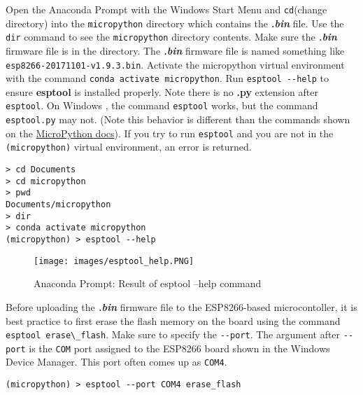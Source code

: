 \documentclass{book}
\makeatletter
\def\maxwidth{\ifdim\Gin@nat@width>\linewidth\linewidth
\else\Gin@nat@width\fi}
\let\Oldincludegraphics\includegraphics
\renewcommand{\includegraphics}[1]{\Oldincludegraphics[width=.8\maxwidth]{#1}}
\newcommand{\passthrough}[1]{#1}
\makeatother
\begin{document}
    
        Open the Anaconda Prompt with the Windows Start Menu and
\passthrough{\lstinline!cd!}(change directory) into the
\passthrough{\lstinline!micropython!} directory which contains the
\textbf{\emph{.bin}} file. Use the \passthrough{\lstinline!dir!} command
to see the \passthrough{\lstinline!micropython!} directory contents.
Make sure the \textbf{\emph{.bin}} firmware file is in the directory.
The \textbf{\emph{.bin}} firmware file is named something like
\passthrough{\lstinline!esp8266-20171101-v1.9.3.bin!}. Activate the
micropython virtual environment with the command
\passthrough{\lstinline!conda activate micropython!}. Run
\passthrough{\lstinline!esptool --help!} to ensure \textbf{esptool} is
installed properly. Note there is no \textbf{.py} extension after
\passthrough{\lstinline!esptool!}. On Windows , the command
\passthrough{\lstinline!esptool!} works, but the command
\passthrough{\lstinline!esptool.py!} may not. (Note this behavior is
different than the commands shown on the
\href{https://docs.micropython.org/en/latest/esp8266/esp8266/tutorial/intro.html\#deploying-the-firmware}{MicroPython
docs}). If you try to run \passthrough{\lstinline!esptool!} and you are
not in the \passthrough{\lstinline!(micropython)!} virtual environment,
an error is returned.

\begin{lstlisting}
> cd Documents
> cd micropython
> pwd
Documents/micropython
> dir
> conda activate micropython
(micropython) > esptool --help
\end{lstlisting}

\begin{figure}
\centering
\texttt{[image: images/esptool\_help.PNG]}
\caption{Anaconda Prompt: Result of esptool --help command}
\end{figure}

Before uploading the \textbf{\emph{.bin}} firmware file to the
ESP8266-based microcontoller, it is best practice to first erase the
flash memory on the board using the command
\passthrough{\lstinline!esptool erase\_flash!}. Make sure to specify the
\passthrough{\lstinline!--port!}. The argument after
\passthrough{\lstinline!--port!} is the \passthrough{\lstinline!COM!}
port assigned to the ESP8266 board shown in the Windows Device Manager.
This port often comes up as \passthrough{\lstinline!COM4!}.

\begin{lstlisting}
(micropython) > esptool --port COM4 erase_flash
\end{lstlisting}
\end{document}
